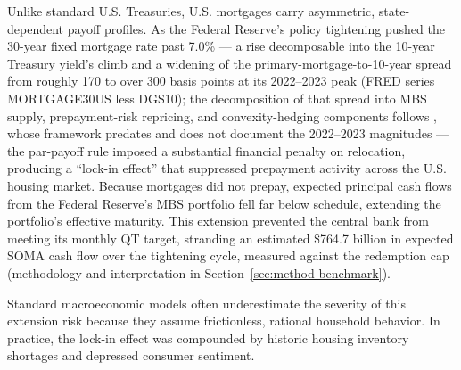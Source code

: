 \documentclass[12pt]{article}
\begin{document}
Unlike standard U.S. Treasuries, U.S. mortgages carry asymmetric, state-dependent payoff profiles. As the Federal Reserve's policy tightening pushed the 30-year fixed mortgage rate past 7.0\% --- a rise decomposable into the 10-year Treasury yield's climb and a widening of the primary-mortgage-to-10-year spread from roughly 170 to over 300 basis points at its 2022--2023 peak (FRED series MORTGAGE30US less DGS10); the decomposition of that spread into MBS supply, prepayment-risk repricing, and convexity-hedging components follows \citet{boyarchenko2019}, whose framework predates and does not document the 2022--2023 magnitudes --- the par-payoff rule imposed a substantial financial penalty on relocation, producing a ``lock-in effect'' that suppressed prepayment activity across the U.S. housing market. Because mortgages did not prepay, expected principal cash flows from the Federal Reserve's MBS portfolio fell far below schedule, extending the portfolio's effective maturity. This extension prevented the central bank from meeting its monthly QT target, stranding an estimated \$764.7 billion in expected SOMA cash flow over the tightening cycle, measured against the redemption cap (methodology and interpretation in Section~\ref{sec:method-benchmark}).

Standard macroeconomic models often underestimate the severity of this extension risk because they assume frictionless, rational household behavior. In practice, the lock-in effect was compounded by historic housing inventory shortages and depressed consumer sentiment.
\end{document}
